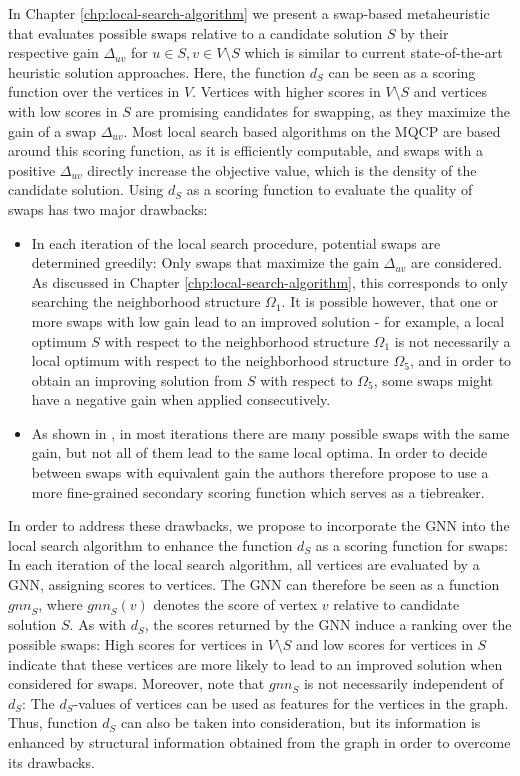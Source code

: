 \documentclass[draft,final]{vutinfth} %
\begin{document}
In Chapter \ref{chp:local-search-algorithm} we present a swap-based metaheuristic that evaluates possible swaps relative to a candidate solution $S$ by their respective gain $\Delta_{uv}$ for $u \in S, v \in V \setminus S$ which is similar to current state-of-the-art heuristic solution approaches. 
Here, the function $d_S$ can be seen as a scoring function over the vertices in $V$. Vertices with higher scores in $V \setminus S$ and vertices with low scores in $S$ are promising candidates for swapping, as they maximize the gain of a swap $\Delta_{uv}$. 
Most local search based algorithms on the MQCP are based around this scoring function, as it is efficiently computable, and swaps with a positive $\Delta_{uv}$ directly increase the objective value, which is the density of the candidate solution. 
Using $d_S$ as a scoring function to evaluate the quality of swaps has two major drawbacks:
\begin{itemize}
    \item In each iteration of the local search procedure, potential swaps are determined greedily: Only swaps that maximize the gain $\Delta_{uv}$ are considered. As discussed in Chapter \ref{chp:local-search-algorithm}, this corresponds to only searching the neighborhood structure $\Omega_1$. It is possible however, that one or more swaps with low gain lead to an improved solution - for example, a local optimum $S$ with respect to the neighborhood structure $\Omega_1$ is not necessarily a local optimum with respect to the neighborhood structure $\Omega_5$, and in order to obtain an improving solution from $S$ with respect to $\Omega_5$, some swaps might have a negative gain when applied consecutively. 
    \item As shown in \cite{chen_nuqclq_2021}, in most iterations there are many possible swaps with the same gain, but not all of them lead to the same local optima. In order to decide between swaps with equivalent gain the authors therefore propose to use a more fine-grained secondary scoring function which serves as a tiebreaker. 
\end{itemize}

In order to address these drawbacks, we propose to incorporate the GNN into the local search algorithm to enhance the function $d_S$ as a scoring function for swaps: In each iteration of the local search algorithm, all vertices are evaluated by a GNN, assigning scores to vertices. The GNN can therefore be seen as a function $\mathit{gnn}_S$, where $\mathit{gnn}_S(v)$ denotes the score of vertex $v$ relative to candidate solution $S$. 
As with $d_S$, the scores returned by the GNN induce a ranking over the possible swaps: High scores for vertices in $V \setminus S$ and low scores for vertices in $S$ indicate that these vertices are more likely to lead to an improved solution when considered for swaps. 
Moreover, note that $gnn_S$ is not necessarily independent of $d_S$: The $d_S$-values of vertices can be used as features for the vertices in the graph. Thus, function $d_S$ can also be taken into consideration, but its information is enhanced by structural information obtained from the graph in order to overcome its drawbacks. 
\end{document}
